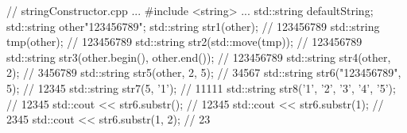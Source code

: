 
\begin{cpp}
// stringConstructor.cpp
...
#include <string>
...
std::string defaultString;
std::string other{"123456789"};
std::string str1(other); // 123456789
std::string tmp(other); // 123456789
std::string str2(std::move(tmp)); // 123456789
std::string str3(other.begin(), other.end()); // 123456789
std::string str4(other, 2); // 3456789
std::string str5(other, 2, 5); // 34567
std::string str6("123456789", 5); // 12345
std::string str7(5, '1'); // 11111
std::string str8({'1', '2', '3', '4', '5'}); // 12345
std::cout << str6.substr(); // 12345
std::cout << str6.substr(1); // 2345
std::cout << str6.substr(1, 2); // 23
\end{cpp}































